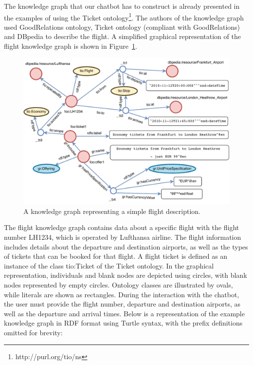 \documentclass[runningheads]{llncs}
\begin{document}
The knowledge graph that our chatbot has to construct is already presented in the examples of using the Ticket ontology\footnote{\label{Ticket Ontology}http://purl.org/tio/ns}. The authors of the knowledge graph used GoodRelations ontology\cite{hepp2008goodrelations}, Ticket ontology (compliant with GoodRelations) and DBpedia to describe the flight. A simplified graphical representation of the flight knowledge graph is shown in Figure~\ref{fig:usecase}.
\begin{figure}[H]
  \centering
  \includegraphics[width=\linewidth]{img/use_case}
  \caption{A knowledge graph representing a simple flight description.}
  \label{fig:usecase}
\end{figure}
The flight knowledge graph contains data about a specific flight with the flight number LH1234, which is operated by Lufthansa airline. The flight information includes details about the departure and destination airports, as well as the types of tickets that can be booked for that flight. A flight ticket is defined as an instance of the class tio:Ticket of the Ticket ontology. In the graphical representation, individuals and blank nodes are depicted using circles, with blank nodes represented by empty circles. Ontology classes are illustrated by ovals, while literals are shown as rectangles. 
\FloatBarrier
During the interaction with the chatbot, the user must provide the flight number, departure and destination airports, as well as the departure and arrival times.
Below is a representation of the example knowledge graph in RDF format using Turtle syntax, with the prefix definitions omitted for brevity:
\end{document}
